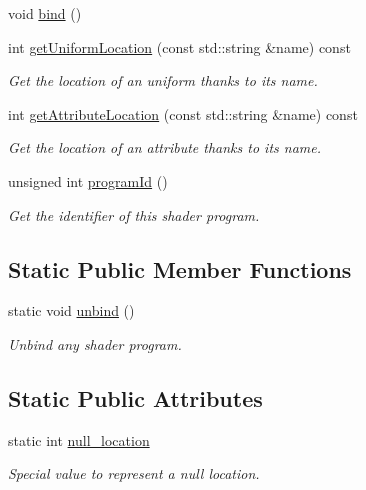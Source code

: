 \begin{DoxyCompactItemize}
void \hyperlink{classShaderProgram_ab3c3e75ddf54504b5e9f53bf85c34736}{bind} ()
\item 
int \hyperlink{classShaderProgram_a4f58620a6426bf12a65aa374f6265b96}{get\+Uniform\+Location} (const std\+::string \&name) const 
\begin{DoxyCompactList}\small\item\em Get the location of an uniform thanks to its name. \end{DoxyCompactList}\item 
int \hyperlink{classShaderProgram_a189bf49ca91ae75861fed4ef8c72753b}{get\+Attribute\+Location} (const std\+::string \&name) const 
\begin{DoxyCompactList}\small\item\em Get the location of an attribute thanks to its name. \end{DoxyCompactList}\item 
unsigned int \hyperlink{classShaderProgram_a46b6ae259a04719af0eeeb4aac0be217}{program\+Id} ()
\begin{DoxyCompactList}\small\item\em Get the identifier of this shader program. \end{DoxyCompactList}\end{DoxyCompactItemize}
\subsection*{Static Public Member Functions}
\begin{DoxyCompactItemize}
\item 
static void \hyperlink{classShaderProgram_a67fb2d8013068ee96625c7f47d979923}{unbind} ()
\begin{DoxyCompactList}\small\item\em Unbind any shader program. \end{DoxyCompactList}\end{DoxyCompactItemize}
\subsection*{Static Public Attributes}
\begin{DoxyCompactItemize}
\item 
static int \hyperlink{classShaderProgram_a8e974f0576fc00d5f86ce292ba8921b7}{null\+\_\+location}
\begin{DoxyCompactList}\small\item\em Special value to represent a null location. \end{DoxyCompactList}\end{DoxyCompactItemize}
